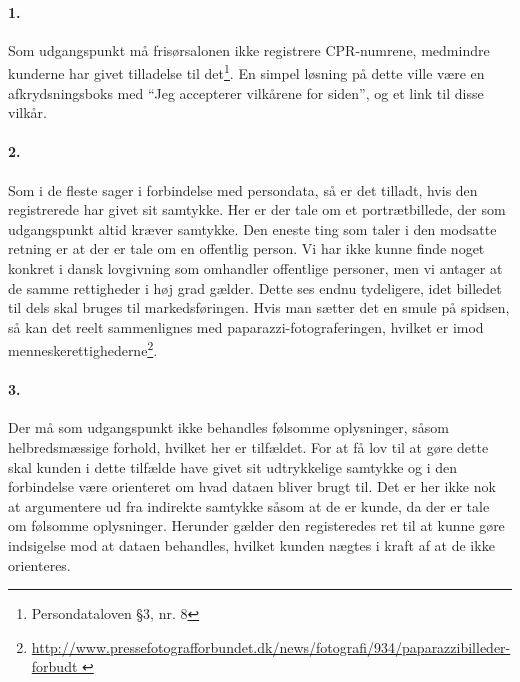 



\maketitle

\tableofcontents

\thispagestyle{empty}

\paragraph{1.} Som udgangspunkt må frisørsalonen ikke registrere CPR-numrene,
medmindre kunderne har givet tilladelse til det\footnote{Persondataloven §3, nr.
8}. En simpel løsning på dette ville være en afkrydsningsboks med ``Jeg
accepterer vilkårene for siden'', og et link til disse vilkår.

\paragraph{2.} Som i de fleste sager i forbindelse med persondata, så
er det tilladt, hvis den registrerede har givet sit samtykke. Her er der
tale om et portrætbillede, der som udgangspunkt altid kræver samtykke.
Den eneste ting som taler i den modsatte retning er at der er tale om en
offentlig person. Vi har ikke kunne finde noget konkret i dansk lovgivning
som omhandler offentlige personer, men vi antager at de samme rettigheder i
høj grad gælder. Dette ses endnu tydeligere, idet billedet til dels skal
bruges til markedsføringen. Hvis man sætter det en smule på spidsen, så
kan det reelt sammenlignes med paparazzi-fotograferingen, hvilket er imod
menneskerettighederne\footnote{\url{
    http://www.pressefotografforbundet.dk/news/fotografi/934/paparazzibilleder-forbudt
}}.

\paragraph{3.} Der må som udgangspunkt ikke behandles følsomme oplysninger,
såsom helbredsmæssige forhold, hvilket her er tilfældet.
For at få lov til at gøre dette skal kunden i dette tilfælde have givet
sit udtrykkelige samtykke og i den forbindelse være orienteret om hvad
dataen bliver brugt til. Det er her ikke nok at argumentere ud fra indirekte
samtykke såsom at de er kunde, da der er tale om følsomme oplysninger.
Herunder gælder den registeredes ret til at kunne gøre indsigelse mod
at dataen behandles, hvilket kunden nægtes i kraft af at de ikke
orienteres.

